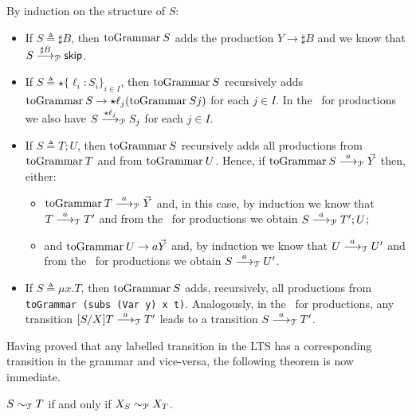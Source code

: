 \begin{itemizeproof}
  By induction on the structure of $S$: 
  \begin{itemize}
  \item If $S \triangleq \sharp B$, then $\toGrammarf S$ adds the
    production $Y\rightarrow \sharp B$ and we know that
    $S \LTSderivesP[\sharp B] \skipk$.
  \item If $S\triangleq \star \{\ell_i : S_i\}_{i\in I}$, then
    $\toGrammarf S$ recursively adds
    $\toGrammarf S \rightarrow \star \ell_j(\toGrammarf{Sj})$ for each
    $j\in I$. In the \LTS\ for productions we also have
    $S \LTSderivesP[\star\ell_j] S_j$ for each $j\in I$.
  \item If $S \triangleq T;U$, then $\toGrammarf S$ recursively adds
    all productions from $\toGrammarf T$ and from $\toGrammarf
    U$. Hence, if $\toGrammarf S \LTSderivesP \vec Y$ then, either:
    \begin{itemize}
    \item $\toGrammarf T \LTSderivesP \vec Y$ and, in this case, by
      induction we know that $T \LTSderives T'$ and from the \LTS\ for
      productions we obtain $S \LTSderivesP T';U$;
    \item {} and $\toGrammarf U \rightarrow a\vec Y$ and, by
      induction we know that $U \LTSderives[a] U'$ and from the \LTS\
      for productions we obtain $S \LTSderives U'$.
    \end{itemize}
  \item If $S\triangleq \mu x.T$, then $\toGrammarf S$ adds,
    recursively, all productions from
    \lstinline|toGrammar (subs (Var y) x t)|.  Analogously, in the
    \LTS\ for productions, any transition $\subs SXT \LTSderives T'$
    leads to a transition $S \LTSderives T'$. \vv{Why?}
  \end{itemize}
\end{itemizeproof}

Having proved that any labelled transition in the LTS has a corresponding
transition in the grammar and vice-versa, the following theorem is now
immediate.

\begin{theorem}
  \label{thm:cfst_vs_grammar}
  $S\TypeEquiv T$  if and only if $ X_S \ProdEquiv X_T$.
\end{theorem}

